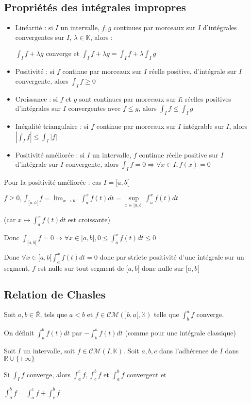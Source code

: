 \documentclass[a4paper,12pt]{book}
\newcommand{\Def}[2]{\begin{tcolorbox}[sharp corners, colback=white,colframe=blue!90!black!75, title=Définition : #1]#2\end{tcolorbox}}
\newcommand{\Prop}[2]{\begin{tcolorbox}[sharp corners, colback=white,colframe=red!90!black!75, title=Proposition : #1]#2\end{tcolorbox}}
\newcommand{\Pre}[1]{\begin{tcolorbox}[sharp corners, colback=white,colframe=green!60!green!30!black!75, title=Preuve]#1\end{tcolorbox}}
\def\R{\mathbb{R}}
\def\K{\mathbb{K}}
\begin{document}
\subsection{Propriétés des intégrales impropres}
\Prop{Propriétés des intégrales impropres}{\begin{itemize}
\item Linéarité : si $I$ un intervalle, $f,g$ continues par morceaux sur $I$ d'intégrales convergentes sur $I$, $\lambda\in\K$, alors : \par \begin{center}$\int_If + \lambda g$ converge et $\int_If+\lambda g = \int_I f+\lambda\int_Ig$ \end{center}
\item Positivité : si $f$ continue par morceaux sur $I$ réelle positive, d'intégrale sur $I$ convergente, alors $\int_If\geq 0$
\item Croissance : si $f$ et $g$ sont continues par morceaux sur $I$i réelles positives d'intégrales sur $I$ convergentes avec $f\leq g$, alors $\int_If\leq \int_Ig$
\item Inégalité triangulaire : si $f$ continue par morceaux sur $I$ intégrable sur $I$, alors $\left\vert\int_If\right\vert \leq\int_I\vert f\vert$ 
\item Positivité améliorée : si $I$ un intervalle, $f$ continue réelle positive sur $I$ d'intégrale sur $I$ convergente, alors $\int_If = 0 \Rightarrow \forall x\in I, f(x)=0$
\end{itemize}}
\Pre{Pour la positivité améliorée : cas $I = [a,b[$ \par $f\geq 0, \int_{[a,b[}f = \lim_{x\to b^-}\int_a^xf(t)dt = \sup\limits_{x\in[a,b[}\int_a^xf(t)dt$ \par (car $x\mapsto \int_a^xf(t)dt$ est croissante) \par Donc $\int_{[a,b[}f = 0 \Rightarrow \forall x\in [a,b[, 0\leq \int_a^x f(t)dt\leq 0$ \par Donc $\forall x\in[a,b[\int_a^xf(t)dt=0$ donc par stricte positivité d'une intégrale sur un segment, $f$ est nulle sur tout segment de $[a,b[$ donc nulle sur $[a,b[$}

\subsection{Relation de Chasles}
\Def{}{Soit $a,b\in\bar{\R}$, tels que $a<b$ et $f\in\mathcal{CM}(]b,a[,\K)$ telle que $\int_b^af$ converge. \par On définit $\int_a^bf(t)dt$ par $-\int_b^af(t)dt$ (comme pour une intégrale classique)}
\Prop{Relation de Chasles}{Soit $I$ un intervalle, soit $f\in\mathcal{CM}(I,\K)$. Soit $a,b,c$ dans l'adhérence de $I$ dans $\R\cup\{+\infty\}$ \par Si $\int_If$ converge, alors $\int_a^cf, \int_c^bf$ et $\int_a^bf$ convergent et \par\begin{center}$\int_a^bf=\int_a^cf+\int_c^bf$\end{center}}
\end{document}

